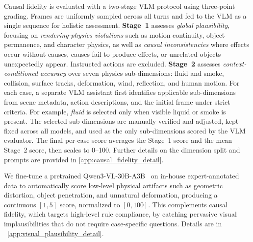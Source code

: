 Causal fidelity is evaluated with a two-stage VLM protocol using three-point grading. Frames are uniformly sampled across all turns and fed to the VLM as a single sequence for holistic assessment.
\textbf{Stage~1} assesses \emph{global plausibility}, focusing on \emph{rendering-physics violations} such as motion continuity, object permanence, and character physics, as well as \emph{causal inconsistencies} where effects occur without causes, causes fail to produce effects, or unrelated objects unexpectedly appear. Instructed actions are excluded.
\textbf{Stage~2} assesses \emph{context-conditioned accuracy} over seven physics sub-dimensions: fluid and smoke, collision, surface tracks, deformation, wind, reflection, and human motion. For each case, a separate VLM assistant first identifies applicable sub-dimensions from scene metadata, action descriptions, and the initial frame under strict criteria. For example, \emph{fluid} is selected only when visible liquid or smoke is present. The selected sub-dimensions are manually verified and adjusted, kept fixed across all models, and used as the only sub-dimensions scored by the VLM evaluator.
The final per-case score averages the Stage~1 score and the mean Stage~2 score, then scales to 0--100. Further details on the dimension split and prompts are provided in \ref{app:causal_fidelity_detail}.


We fine-tune a pretrained Qwen3-VL-30B-A3B~\cite{Qwen3-VL} on in-house expert-annotated data to automatically score low-level physical artifacts such as geometric distortion, object penetration, and unnatural deformation, producing a continuous $[1, 5]$ score, normalized to $[0, 100]$.
This complements causal fidelity, which targets high-level rule compliance, by catching pervasive visual implausibilities that do not require case-specific questions. Details are in ~\cref{app:visual_plausibility_detail}.

